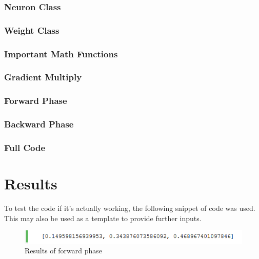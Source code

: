 \documentclass[a4paper, 11pt, english]{article}
\begin{document}
\subsubsection{Neuron Class}

\subsubsection{Weight Class}

\subsubsection{Important Math Functions}

\subsubsection{Gradient Multiply} %

\subsubsection{Forward Phase}

\subsubsection{Backward Phase}

\subsubsection{Full Code}


\section{Results}
\par To test the code if it's actually working, the following snippet of code was used. This may also be used as a template to provide further inputs.

\begin{figure}[H]
  \centering
  \includegraphics[width=12cm]{images/result1.png}
  \caption{Results of forward phase} %
  \label{fig:result1}
\end{figure}
\end{document}
